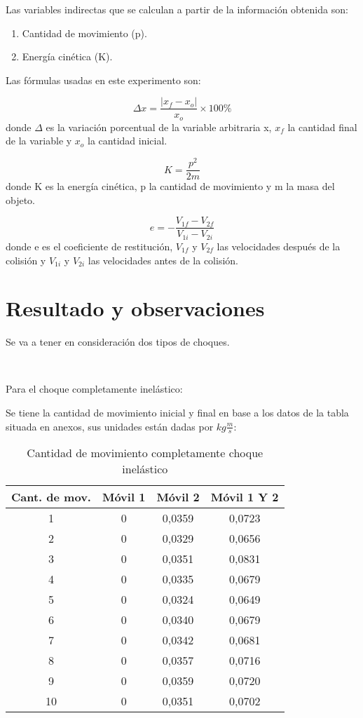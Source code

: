 \documentclass[a4paper]{article}
\begin{document}
Las variables indirectas que se calculan a partir de la información obtenida son:
\begin{enumerate}
  \item Cantidad de movimiento (p).
  \item Energía cinética (K).
\end{enumerate}

Las fórmulas usadas en este experimento son:

\begin{equation}
    \Delta x=\frac{|x_{f}-x_{o}|}{x_{o}}\times 100\%
\end{equation}
donde $\Delta$ es la variación porcentual de la variable arbitraria x, $x_{f}$ la cantidad final de la variable y $x_{o}$ la cantidad inicial. 

\begin{equation}
    K=\frac{p^2}{2m}
\end{equation}
donde K es la energía cinética, p la cantidad de movimiento y m la masa del objeto. 

\begin{equation}
    e=-\frac{V_{1f}-V_{2f}}{V_{1i}-V_{2i}}
\end{equation}
donde e es el coeficiente de restitución, $V_{1f}$ y $ V_{2f}$ las velocidades después de la colisión y $V_{1i}$ y $V_{2i}$ las velocidades antes de la colisión.

\section{Resultado y observaciones}
Se va a tener en consideración dos tipos de choques.

\

Para el choque completamente inelástico:

Se tiene la cantidad de movimiento inicial y final en base a los datos de la tabla situada en anexos, sus unidades están dadas por $kg \frac{m}{s}$:

\begin{table}[H]
    \centering
    \begin{tabular}{|c|c|c|c|}
    \hline
        Cant. de mov. & Móvil 1 & Móvil 2 & Móvil 1 Y 2  \\ \hline
        1 & 0 & 0,0359 & 0,0723  \\ \hline
        2 & 0 & 0,0329 & 0,0656  \\ \hline
        3 & 0 & 0,0351 & 0,0831  \\ \hline
        4 & 0 & 0,0335 & 0,0679  \\ \hline
        5 & 0 & 0,0324 & 0,0649  \\ \hline
        6 & 0 & 0,0340 & 0,0679  \\ \hline
        7 & 0 & 0,0342 & 0,0681  \\ \hline
        8 & 0 & 0,0357 & 0,0716  \\ \hline
        9 & 0 & 0,0359 & 0,0720  \\ \hline
        10 & 0 & 0,0351 & 0,0702  \\ \hline
    \end{tabular}
    \caption{Cantidad de movimiento completamente choque inelástico}
\end{table}
\end{document}
